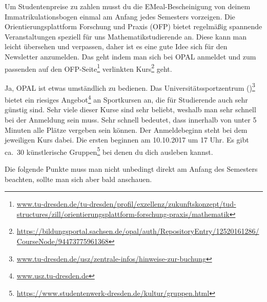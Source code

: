 \documentclass{scrartcl}
\begin{document}
\begin{description}
    Um Studentenpreise zu zahlen musst du die EMeal-Bescheinigung von deinem Immatrikulationsbogen
    einmal am Anfang jedes Semesters vorzeigen.
   Die Orientierungsplattform Forschung und Praxis (OFP) bietet regelmäßig spannende Veranstaltungen
    speziell für uns Mathematikstudierende an.
    Diese kann man leicht übersehen und verpassen,
    daher ist es eine gute Idee sich für den Newsletter anzumelden.
    Das geht indem man sich bei OPAL anmeldet und zum passenden auf den
    OFP-Seite\footnote{\url{www.tu-dresden.de/tu-dresden/profil/exzellenz/zukunftskonzept/tud-structures/zill/orientierungsplattform-forschung-praxis/mathematik}}
    verlinkten Kurs\footnote{\url{https://bildungsportal.sachsen.de/opal/auth/RepositoryEntry/12520161286/CourseNode/94473775961368}} geht.
    
    Ja, OPAL ist etwas umständlich zu bedienen.
   Das Universitätssportzentrum ()\footnote{\url{www.tu-dresden.de/usz/zentrale-infos/hinweise-zur-buchung}} bietet ein riesiges Angebot\footnote{\url{www.usz.tu-dresden.de}} an
    Sportkursen an, die für Studierende auch sehr günstig sind.
    Sehr viele dieser Kurse sind sehr beliebt, weshalb man sehr schnell bei der Anmeldung sein muss.
    Sehr schnell bedeutet, dass innerhalb von unter 5 Minuten alle Plätze vergeben sein können.
    Der Anmeldebeginn steht bei dem jeweiligen Kurs dabei. Die ersten beginnen am 10.10.2017 um 17 Uhr.
   Es gibt ca.\ 30 künstlerische Gruppen\footnote{\url{https://www.studentenwerk-dresden.de/kultur/gruppen.html}} bei denen du dich ausleben kannst.
\end{description}
Die folgende Punkte muss man nicht unbedingt direkt am Anfang des Semesters beachten, sollte man
sich aber bald anschauen.
\end{document}
